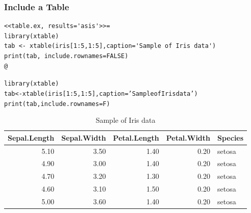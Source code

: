 \documentclass[10pt]{beamer}\usepackage[]{graphicx}\usepackage[]{color}
\makeatletter
\newcommand{\hlnum}[1]{\textcolor[rgb]{0.063,0.58,0.627}{#1}}%
\newcommand{\hlstr}[1]{\textcolor[rgb]{0.063,0.58,0.627}{#1}}%
\newcommand{\hlopt}[1]{\textcolor[rgb]{0.196,0.196,0.196}{#1}}%
\newcommand{\hlstd}[1]{\textcolor[rgb]{0.196,0.196,0.196}{#1}}%
\newcommand{\hlkwb}[1]{\textcolor[rgb]{0.627,0,0.314}{#1}}%
\newcommand{\hlkwc}[1]{\textcolor[rgb]{0,0.631,0.314}{#1}}%
\newcommand{\hlkwd}[1]{\textcolor[rgb]{0.78,0.227,0.412}{#1}}%
\newenvironment{kframe}{%
 \def\at@end@of@kframe{}%
 \ifinner\ifhmode%
  \def\at@end@of@kframe{\end{minipage}}%
  \begin{minipage}{\columnwidth}%
 \fi\fi%
 \def\FrameCommand##1{\hskip\@totalleftmargin \hskip-\fboxsep
 \colorbox{shadecolor}{##1}\hskip-\fboxsep
     \hskip-\linewidth \hskip-\@totalleftmargin \hskip\columnwidth}%
 \MakeFramed {\advance\hsize-\width
   \@totalleftmargin\z@ \linewidth\hsize
   \@setminipage}}%
 {\par\unskip\endMakeFramed%
 \at@end@of@kframe}
\newenvironment{knitrout}{}{} %
\makeatother
\begin{document}
\begin{frame}[fragile]
\frametitle{Include a Table}
\scriptsize
\begin{knitrout}
\color{fgcolor}\begin{kframe}
\begin{verbatim}
<<table.ex, results='asis'>>=
library(xtable)
tab <- xtable(iris[1:5,1:5],caption='Sample of Iris data')
print(tab, include.rownames=FALSE)
@
\end{verbatim}
\end{kframe}
\end{knitrout}
\begin{kframe}
\begin{alltt}
\hlkwd{library}\hlstd{(xtable)}
\hlstd{tab} \hlkwb{<-} \hlkwd{xtable}\hlstd{(iris[}\hlnum{1}\hlopt{:}\hlnum{5}\hlstd{,}\hlnum{1}\hlopt{:}\hlnum{5}\hlstd{],} \hlkwc{caption} \hlstd{=} \hlstr{'Sample of Iris data'}\hlstd{)}
\hlkwd{print}\hlstd{(tab,} \hlkwc{include.rownames} \hlstd{= F)}
\end{alltt}
\end{kframe}%
\begin{table}[ht]
\centering
\begin{tabular}{rrrrl}
  \hline
Sepal.Length & Sepal.Width & Petal.Length & Petal.Width & Species \\ 
  \hline
5.10 & 3.50 & 1.40 & 0.20 & setosa \\ 
  4.90 & 3.00 & 1.40 & 0.20 & setosa \\ 
  4.70 & 3.20 & 1.30 & 0.20 & setosa \\ 
  4.60 & 3.10 & 1.50 & 0.20 & setosa \\ 
  5.00 & 3.60 & 1.40 & 0.20 & setosa \\ 
   \hline
\end{tabular}
\caption{Sample of Iris data} 
\end{table}

\end{frame}
\end{document}
